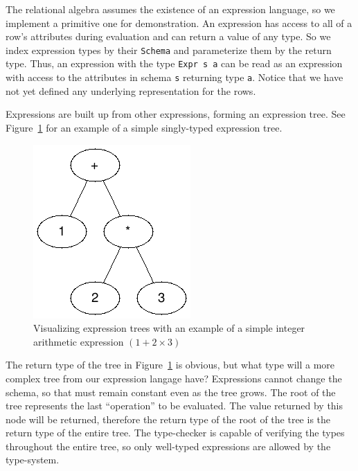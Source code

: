 \documentclass[12pt]{report}
\begin{document}
The relational algebra assumes the existence of an expression language, so we implement a primitive one for demonstration.
An expression has access to all of a row's attributes during evaluation and can return a value of any type.
So we index expression types by their \texttt{Schema} and parameterize them by the return type.
Thus, an expression with the type \texttt{Expr s a} can be read as an expression with access to the attributes in schema \texttt{s} returning type \texttt{a}.
Notice that we have not yet defined any underlying representation for the rows.

Expressions are built up from other expressions, forming an expression tree.
See Figure~\ref{fig:expr_tree} for an example of a simple singly-typed expression tree.

\begin{figure}[h!]
    \centering
    \includegraphics[width=0.25\linewidth]{assets/expr_tree.png}
    \caption{Visualizing expression trees with an example of a simple integer arithmetic expression $(1 + 2 \times 3)$}
    \label{fig:expr_tree}
\end{figure}


The return type of the tree in Figure~\ref{fig:expr_tree} is obvious, but what type will a more complex tree from our expression langage have?
Expressions cannot change the schema, so that must remain constant even as the tree grows.
The root of the tree represents the last ``operation'' to be evaluated.
The value returned by this node will be returned, therefore the return type of the root of the tree is the return type of the entire tree.
The type-checker is capable of verifying the types throughout the entire tree, so only well-typed expressions are allowed by the type-system.
\end{document}
